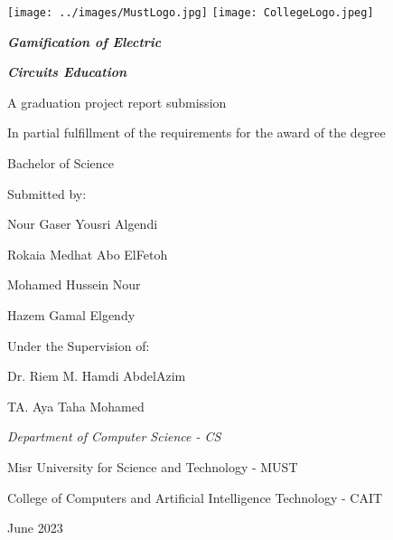 \documentclass[../main.tex]{subfiles}
\begin{document}
\centering
\texttt{[image: ../images/MustLogo.jpg]}
\hspace{6cm}
\texttt{[image: CollegeLogo.jpeg]}
\vspace{2cm}

\textit{\textbf{\LARGE Gamification of Electric}}

\textit{\textbf{\LARGE Circuits Education}}

\vspace{2cm}
A graduation project report submission

In partial fulfillment of the requirements for the award of the degree

Bachelor of Science

\vspace{2cm}
\large
Submitted by:

\vspace{1cm}
Nour Gaser Yousri Algendi

Rokaia Medhat Abo ElFetoh

Mohamed Hussein Nour

Hazem Gamal Elgendy
 
\vspace{1.5cm}
Under the Supervision of:

Dr. Riem M. Hamdi AbdelAzim

TA. Aya Taha Mohamed


\vspace{2cm}
\normalsize
\textit{Department of Computer Science - CS}

Misr University for Science and Technology - MUST

College of Computers and Artificial Intelligence Technology - CAIT

June 2023
\end{document}

